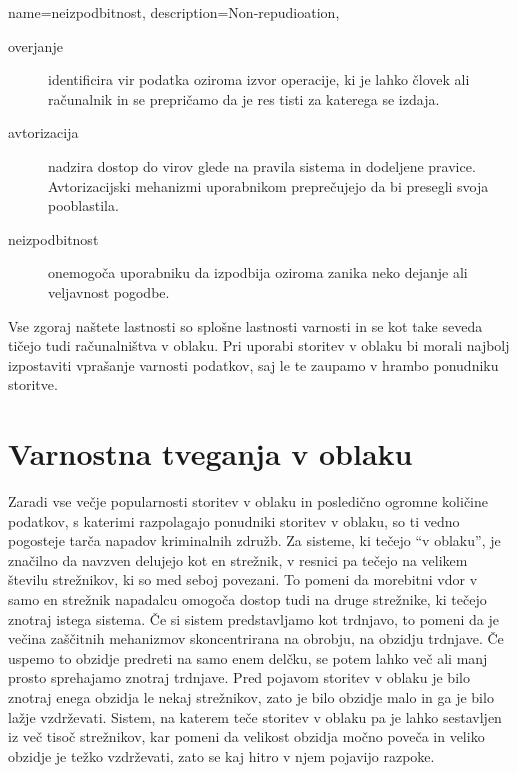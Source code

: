\documentclass[12pt,a4paper,openany]{book}
\begin{document}
{
  name=neizpodbitnost,
  description={Non-repudioation},
}

\begin{description}

\item[\Gls{overjanje}] identificira vir podatka oziroma izvor operacije, ki je lahko človek ali računalnik in se prepričamo da je res tisti za katerega se izdaja.

\item[\Gls{avtorizacija}] nadzira dostop do virov glede na pravila sistema in dodeljene pravice. Avtorizacijski mehanizmi uporabnikom preprečujejo da bi presegli svoja pooblastila.

\item[\Gls{neizpodbitnost}] onemogoča uporabniku da izpodbija oziroma zanika neko dejanje ali veljavnost pogodbe.

\end{description}

Vse zgoraj naštete lastnosti so splošne lastnosti varnosti in se kot take seveda tičejo tudi računalništva v oblaku. Pri uporabi storitev v oblaku bi morali najbolj izpostaviti vprašanje varnosti podatkov, saj le te zaupamo v hrambo ponudniku storitve.

\chapter{Varnostna tveganja v oblaku}

Zaradi vse večje popularnosti storitev v oblaku in posledično ogromne količine podatkov, s katerimi razpolagajo ponudniki storitev v oblaku, so ti vedno pogosteje tarča napadov kriminalnih združb. Za sisteme, ki tečejo “v oblaku”, je značilno da navzven delujejo kot en strežnik, v resnici pa tečejo na velikem številu strežnikov, ki so med seboj povezani. To pomeni da morebitni vdor v samo en strežnik napadalcu omogoča dostop tudi na druge strežnike, ki tečejo znotraj istega sistema. Če si sistem predstavljamo kot trdnjavo, to pomeni da je večina zaščitnih mehanizmov skoncentrirana na obrobju, na obzidju trdnjave. Če uspemo to obzidje predreti na samo enem delčku, se potem lahko več ali manj prosto sprehajamo znotraj trdnjave. Pred pojavom storitev v oblaku je bilo znotraj enega obzidja le nekaj strežnikov, zato je bilo obzidje malo in ga je bilo lažje vzdrževati. Sistem, na katerem teče storitev v oblaku pa je lahko sestavljen iz več tisoč strežnikov, kar pomeni da velikost obzidja močno poveča in veliko obzidje je težko vzdrževati, zato se kaj hitro v njem pojavijo razpoke.
\end{document}
